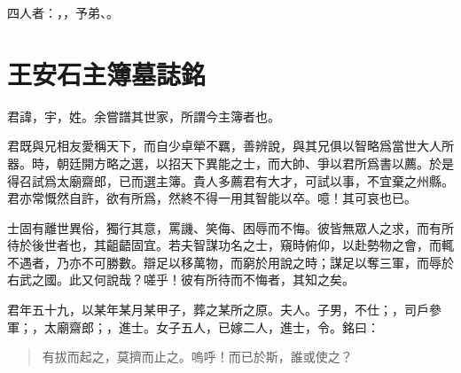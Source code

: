 四人者：，，予弟、。%

\section[泰州海陵縣主簿許君墓誌銘\quad{\small 王安石}]{{\normalsize 王安石}\quad {}主簿墓誌銘}
君諱，宇，姓。余嘗譜其世家，所謂今主簿者也。

君既與兄相友愛稱天下，而自少卓犖不羈，善{辨}說，與其兄俱以智略爲當世大人所器。時，朝廷開方略之選，以招天下異能之士，而大帥、爭以君所爲書以薦。於是得召試爲太廟齋郎，已而選主簿。貴人多薦君有大才，可試以事，不宜棄之州縣。君亦常慨然自許，欲有所爲，然終不得一用其智能以卒。噫！其可哀也已。%

士固有離世異俗，獨行其意，罵譏、笑侮、困辱而不悔。彼皆無眾人之求，而有所待於後世者也，其齟齬固宜。若夫智謀功名之士，窺時俯仰，以赴勢{物}之會，而輒不遇者，乃亦不可勝數。辯足以移萬物，而窮於用說之時；謀足以奪三軍，而辱於右武之國。此又何說哉？嗟乎！彼有所待而不悔者，其知之矣。%

君年五十九，以某年某月某甲子，葬之某所之原。夫人。子男，不仕；，司戶參軍；，太廟齋郎；，進士。女子五人，已嫁二人，進士，令。銘曰：

\begin{quote}
有拔而起之，莫擠而止之。嗚呼！而已於斯，誰或使之？
\end{quote}
\vspace{-1em}
\theendnotes
